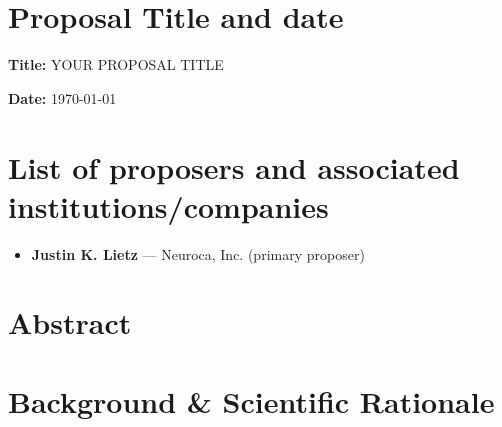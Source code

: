 \documentclass[11pt]{article}
\author[1]{Justin K. Lietz}
\affil[1]{Neuroca, Inc.}
\title{\ProposalTitle}
\date{\ProposalDate}
\newcommand{\ProposalTitle}{YOUR PROPOSAL TITLE}
\newcommand{\ProposalDate}{\today}
\theoremstyle{plain}
\theoremstyle{remark}
\begin{document}
\maketitle

\section{Proposal Title and date}
\textbf{Title:} \ProposalTitle

\textbf{Date:} \ProposalDate


\section{List of proposers and associated institutions/companies}
\begin{itemize}
  \item \textbf{Justin K. Lietz} — Neuroca, Inc. (primary proposer)
\end{itemize}

\section{Abstract}

\section{Background \& Scientific Rationale}
\end{document}
